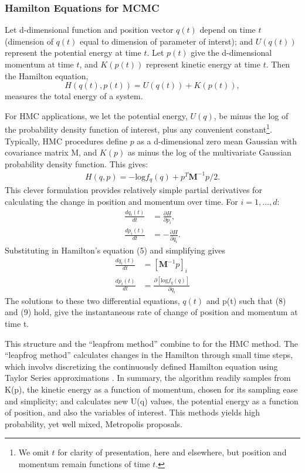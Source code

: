 \subsubsection{Hamilton Equations for MCMC} %

Let d-dimensional function and position vector $q(t)$ depend on time $t$ (dimension of $q(t)$ equal to dimension of parameter of interst); and $U(q(t))$ represent the potential energy at time $t$. Let $p(t)$ give the d-dimensional momentum at time $t$, and $K(p(t))$ represent kinetic energy at time $t$. Then the Hamilton equation,
\begin{equation}
H(q(t),p(t)) = U(q(t)) + K(p(t)),
\end{equation}
measures the total energy of a system. 

For HMC applications, we let the potential energy, $U(q)$, be minus the log of the probability density function of interest, plus any convenient constant\footnote{We omit $t$ for clarity of presentation, here and elsewhere, but position and momentum remain functions of time $t$.}. Typically, HMC procedures define $p$ as a d-dimensional zero mean Gaussian with covariance matrix M, and $K(p)$ as minus the log of the multivariate Gaussian probability density function. This gives:
\begin{align}
H(q,p) = -\text{log}f_{q}(q) + p^{T}\pmb{M}^{-1}p/2.
\end{align}
This clever formulation provides relatively simple partial derivatives for calculating the change in position and momentum over time. For $i = 1,\dots, d$:
\begin{align}
\frac{d q_{i}(t)}{dt} &= \frac{\partial H}{\partial p_{i}}, \\
\frac{d p_{i}(t)}{dt} &= -\frac{\partial H}{\partial q_{i}}.
\end{align}
Substituting in Hamilton's equation (5) and simplifying gives
\begin{align}
\frac{d q_{i}(t)}{dt} &=  [\pmb{M}^{-1}p]_{i} \\
\frac{d p_{i}(t)}{dt} &= \frac {\partial \left[ \text{log}f_{q}(q) \right]}{\partial q_{i}}
\end{align}
The solutions to these two differential equations, $q(t)$ and p(t) such that (8) and (9) hold, give the instantaneous rate of change of position and momentum at time t. 

This structure and the ``leapfrom method'' combine to for the HMC method. The ``leapfrog method'' calculates changes in the Hamilton through small time steps, which involvs discretizing the continuously defined Hamilton equation using Taylor Series approximations \citep{Neal2011}. In summary, the algorithm readily samples from K(p), the kinetic energy as a function of momentum, chosen for its sampling ease and simplicity; and calculates new U(q) values, the potential energy as a function of position, and also the variables of interest. This methods yields high probability, yet well mixed, Metropolis proposals.

